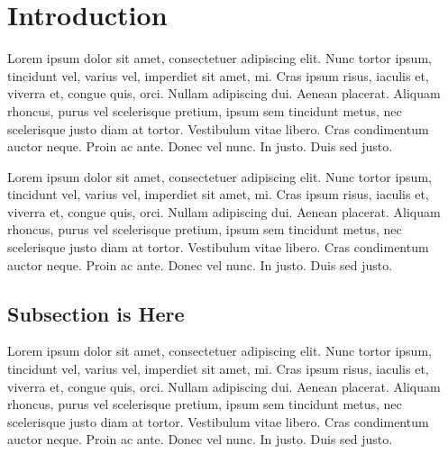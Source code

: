 \section{Introduction}

Lorem ipsum dolor sit amet, consectetuer adipiscing elit. Nunc tortor ipsum, tincidunt vel, varius vel, imperdiet sit amet, mi. Cras ipsum risus, iaculis et, viverra et, congue quis, orci. Nullam adipiscing dui. Aenean placerat. Aliquam rhoncus, purus vel scelerisque pretium, ipsum sem tincidunt metus, nec scelerisque justo diam at tortor. Vestibulum vitae libero. Cras condimentum auctor neque. Proin ac ante. Donec vel nunc. In justo. Duis sed justo.

Lorem ipsum dolor sit amet, consectetuer adipiscing elit. Nunc tortor ipsum, tincidunt vel, varius vel, imperdiet sit amet, mi. Cras ipsum risus, iaculis et, viverra et, congue quis, orci. Nullam adipiscing dui. Aenean placerat. Aliquam rhoncus, purus vel scelerisque pretium, ipsum sem tincidunt metus, nec scelerisque justo diam at tortor. Vestibulum vitae libero. Cras condimentum auctor neque. Proin ac ante. Donec vel nunc. In justo. Duis sed justo.
\subsection{Subsection is Here}
Lorem ipsum dolor sit amet, consectetuer adipiscing elit. Nunc tortor ipsum, tincidunt vel, varius vel, imperdiet sit amet, mi. Cras ipsum risus, iaculis et, viverra et, congue quis, orci. Nullam adipiscing dui. Aenean placerat. Aliquam rhoncus, purus vel scelerisque pretium, ipsum sem tincidunt metus, nec scelerisque justo diam at tortor. Vestibulum vitae libero. Cras condimentum auctor neque. Proin ac ante. Donec vel nunc. In justo. Duis sed justo.


